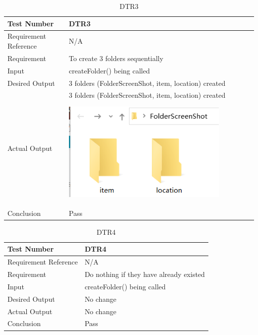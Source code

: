 \documentclass[12pt, titlepage]{article}
\begin{document}
\begin{table}[H]
\begin{center}
\begin{tabular}{|l | m{9cm}|}
\hline
  Test Number & DTR3\\
  \hline
  Requirement Reference & N/A\\
  \hline
  Requirement &  To create 3 folders sequentially\\
  \hline
  Input & createFolder() being called\\
  \hline
  Desired Output & 3 folders (FolderScreenShot, item, location) created\\
  \hline
  Actual Output & 3 folders (FolderScreenShot, item, location) created\includegraphics[width=80mm, height=55mm]{UT1.png}\\
  \hline
  Conclusion & Pass\\
  \hline
\end{tabular}
\end{center}   
\caption{DTR3}
\end{table}
\begin{table}[H]
\begin{center}
\begin{tabular}{|l | m{9cm}|}
\hline
  Test Number & DTR4\\
  \hline
  Requirement Reference & N/A\\
  \hline
  Requirement &  Do nothing if they have already existed\\
  \hline
  Input & createFolder() being called\\
  \hline
  Desired Output & No change\\
  \hline
  Actual Output & No change\\
  \hline
  Conclusion & Pass\\
  \hline
\end{tabular}
\end{center}    
\caption{DTR4}
\end{table}
\end{document}
